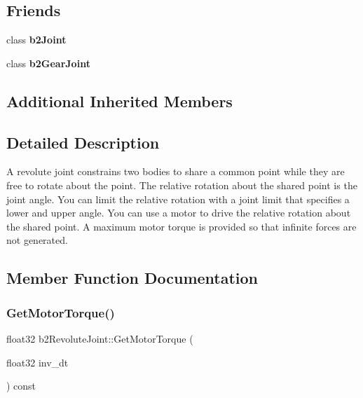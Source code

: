 \subsection*{Friends}
\begin{DoxyCompactItemize}
\item 
\mbox{\label{classb2RevoluteJoint_a54ade8ed3d794298108d7f4c4e4793fa}} 
class {\bfseries b2\+Joint}
\item 
\mbox{\label{classb2RevoluteJoint_a13c275221e30bb485e17e4e04553cb71}} 
class {\bfseries b2\+Gear\+Joint}
\end{DoxyCompactItemize}
\subsection*{Additional Inherited Members}


\subsection{Detailed Description}
A revolute joint constrains two bodies to share a common point while they are free to rotate about the point. The relative rotation about the shared point is the joint angle. You can limit the relative rotation with a joint limit that specifies a lower and upper angle. You can use a motor to drive the relative rotation about the shared point. A maximum motor torque is provided so that infinite forces are not generated. 

\subsection{Member Function Documentation}
\mbox{\label{classb2RevoluteJoint_a5abafb4d0c1df642f73a5d9faf615e26}} 
\subsubsection{\texorpdfstring{Get\+Motor\+Torque()}{GetMotorTorque()}}
{\footnotesize\ttfamily float32 b2\+Revolute\+Joint\+::\+Get\+Motor\+Torque (\begin{DoxyParamCaption}\item[{float32}]{inv\+\_\+dt }\end{DoxyParamCaption}) const}

